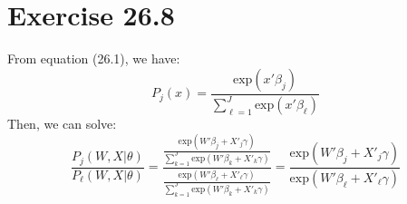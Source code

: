 \documentclass{article}
\newcommand{\e}[1]{\text{exp}\left(#1\right)}
\begin{document}

\section*{Exercise 26.8}
From equation (26.1), we have:
\[
	P_j(x) = \frac{\e{x'\beta_j}}{\sum_{\ell=1}^J\e{x'\beta_\ell}}
\]
Then, we can solve:
\[
	\frac{P_j(W,X|\theta)}{P_\ell(W,X|\theta)}	
		= \frac{\frac{\e{W'\beta_j + X'_j\gamma}}{\sum_{k=1}^J\e{W'\beta_k + X'_k\gamma}}}{\frac{\e{W'\beta_\ell + X'_\ell\gamma}}{\sum_{k=1}^J\e{W'\beta_k + X'_k\gamma}}}
		= \frac{\e{W'\beta_j + X'_j\gamma}}{\e{W'\beta_\ell + X'_\ell\gamma}}
\]

\end{document}
